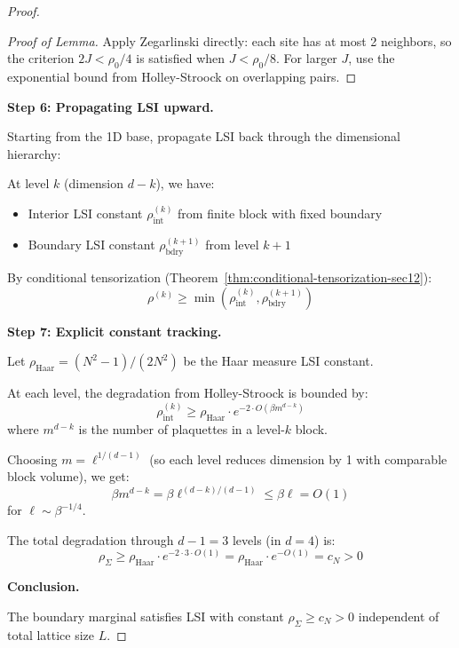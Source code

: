 \begin{proof}
\begin{proof}[Proof of Lemma]
Apply Zegarlinski directly: each site has at most 2 neighbors, so the criterion 
$2J < \rho_0/4$ is satisfied when $J < \rho_0/8$. For larger $J$, use the 
exponential bound from Holley-Stroock on overlapping pairs.
\end{proof}

\textbf{Step 6: Propagating LSI upward.}

Starting from the 1D base, propagate LSI back through the dimensional hierarchy:

At level $k$ (dimension $d-k$), we have:
\begin{itemize}
\item Interior LSI constant $\rho^{(k)}_{\mathrm{int}}$ from finite block with fixed boundary
\item Boundary LSI constant $\rho^{(k+1)}_{\mathrm{bdry}}$ from level $k+1$
\end{itemize}

By conditional tensorization (Theorem~\ref{thm:conditional-tensorization-sec12}):
\[
\rho^{(k)} \geq \min(\rho^{(k)}_{\mathrm{int}}, \rho^{(k+1)}_{\mathrm{bdry}})
\]

\textbf{Step 7: Explicit constant tracking.}

Let $\rho_{\mathrm{Haar}} = (N^2-1)/(2N^2)$ be the Haar measure LSI constant.

At each level, the degradation from Holley-Stroock is bounded by:
\[
\rho^{(k)}_{\mathrm{int}} \geq \rho_{\mathrm{Haar}} \cdot e^{-2 \cdot O(\beta m^{d-k})}
\]
where $m^{d-k}$ is the number of plaquettes in a level-$k$ block.

Choosing $m = \ell^{1/(d-1)}$ (so each level reduces dimension by 1 with comparable 
block volume), we get:
\[
\beta m^{d-k} = \beta \ell^{(d-k)/(d-1)} \leq \beta \ell = O(1)
\]
for $\ell \sim \beta^{-1/4}$.

The total degradation through $d-1 = 3$ levels (in $d = 4$) is:
\[
\rho_\Sigma \geq \rho_{\mathrm{Haar}} \cdot e^{-2 \cdot 3 \cdot O(1)} = \rho_{\mathrm{Haar}} \cdot e^{-O(1)} = c_N > 0
\]

\textbf{Conclusion.}

The boundary marginal satisfies LSI with constant $\rho_\Sigma \geq c_N > 0$ 
independent of total lattice size $L$.
\end{proof}

